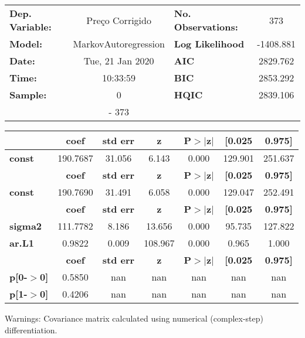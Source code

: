 \begin{center}
\begin{tabular}{lclc}
\toprule
\textbf{Dep. Variable:} &   Preço Corrigido    & \textbf{  No. Observations:  } &    373      \\
\textbf{Model:}         & MarkovAutoregression & \textbf{  Log Likelihood     } & -1408.881   \\
\textbf{Date:}          &   Tue, 21 Jan 2020   & \textbf{  AIC                } &  2829.762   \\
\textbf{Time:}          &       10:33:59       & \textbf{  BIC                } &  2853.292   \\
\textbf{Sample:}        &          0           & \textbf{  HQIC               } &  2839.106   \\
\textbf{}               &         - 373        & \textbf{                     } &             \\
\bottomrule
\end{tabular}
\begin{tabular}{lcccccc}
               & \textbf{coef} & \textbf{std err} & \textbf{z} & \textbf{P$>$$|$z$|$} & \textbf{[0.025} & \textbf{0.975]}  \\
\midrule
\textbf{const} &     190.7687  &       31.056     &     6.143  &         0.000        &      129.901    &      251.637     \\
               & \textbf{coef} & \textbf{std err} & \textbf{z} & \textbf{P$>$$|$z$|$} & \textbf{[0.025} & \textbf{0.975]}  \\
\midrule
\textbf{const} &     190.7690  &       31.491     &     6.058  &         0.000        &      129.047    &      252.491     \\
                & \textbf{coef} & \textbf{std err} & \textbf{z} & \textbf{P$>$$|$z$|$} & \textbf{[0.025} & \textbf{0.975]}  \\
\midrule
\textbf{sigma2} &     111.7782  &        8.186     &    13.656  &         0.000        &       95.735    &      127.822     \\
\textbf{ar.L1}  &       0.9822  &        0.009     &   108.967  &         0.000        &        0.965    &        1.000     \\
                   & \textbf{coef} & \textbf{std err} & \textbf{z} & \textbf{P$>$$|$z$|$} & \textbf{[0.025} & \textbf{0.975]}  \\
\midrule
\textbf{p[0-$>$0]} &       0.5850  &          nan     &       nan  &           nan        &          nan    &          nan     \\
\textbf{p[1-$>$0]} &       0.4206  &          nan     &       nan  &           nan        &          nan    &          nan     \\
\bottomrule
\end{tabular}
\end{center}

Warnings: \newline
 [1] Covariance matrix calculated using numerical (complex-step) differentiation.